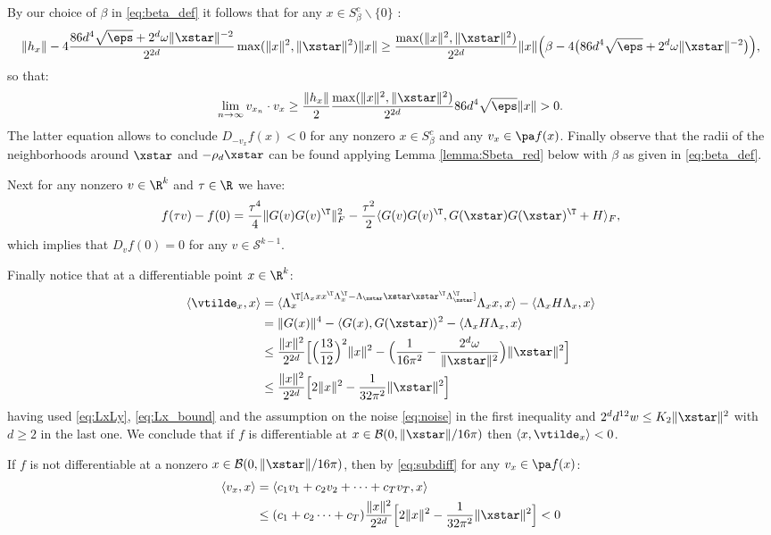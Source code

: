 By our choice of $\beta$ in \eqref{eq:beta_def} it follows that for 
any  $x \in S_\beta^{c} \backslash \{0\}$ :
\[
\|h_x\| - 4  \frac{86 d^4 \sqrt{\eps}  + 2^d \omega \|\xstar\|^{-2}}{2^{2d}}  \max(\|x\|^2, \|\xstar\|^2) \|x\|  \geq \frac{\max(\|x\|^2, \|\xstar\|^2)}{2^{2d}} \|x\| \Big(  \beta- 4 \big(86 d^4 \sqrt{\eps} + 2^d \omega \|\xstar\|^{-2} \big)  \Big),
\]
so that:
\[
\lim_{n \to \infty} v_{x_n} \cdot v_x \geq \frac{\| h_x \|}{2} \frac{\max(\|x\|^2, \|\xstar\|^2)}{2^{2d}} 86 d^4 \sqrt{\eps} \|x \|  > 0.
\]
The latter equation allows to conclude $D_{-v_x} f(x) < 0$  for any nonzero $x \in S_\beta^{c}$ and any $v_x \in \pa f(x)$.
Finally observe that the radii of the neighborhoods around $\xstar$ and $-\rho_d \xstar$ can be found  
applying Lemma \ref{lemma:Sbeta_red} below with $\beta$ as given in \eqref{eq:beta_def}.

Next for any nonzero $v \in \R^{k}$ and $\tau \in \R$ we have:
\[
f(\tau v ) - f(0) = \frac{\tau^4}{4} \|G(v)G(v)^\T\|^2_F - \frac{\tau^2}{2} \langle G(v)G(v)^\T, G(\xstar)G(\xstar)^\T + H \rangle_F,
\] 
which implies that $D_{v} f(0) = 0$ for any $v \in \mathcal{S}^{k-1}$.

Finally notice that at a differentiable point $x \in \R^k$:
\[
\begin{aligned}
\langle \vtilde_x, x \rangle &= \langle \Lambda_x^\T [\Lambda_x x x^\T \Lambda_x^\T - \Lambda_\xstar \xstar \xstar^\T \Lambda_\xstar^\T  ] \Lambda_x x, x \rangle  - \langle \Lambda_x H \Lambda_x , x\rangle \\
&= \|G(x)\|^4 - \langle G(x), G(\xstar)\rangle^2 - \langle \Lambda_x H \Lambda_x , x\rangle \\
&\leq \frac{\|x\|^2}{2^{2d}} \Big[ \Big(\frac{13}{12} \Big)^2 \|x\|^2 - 
\Big(\frac{1}{16 \pi^2} - \frac{2^d \omega}{\|\xstar\|^2} \Big) \|\xstar\|^2 \Big]  \\
&\leq \frac{\|x\|^2}{2^{2d}} \Big[ 2 \|x\|^2 - 
\frac{1}{32 \pi^2} \|\xstar\|^2 \Big]
\end{aligned}
\]
having used \eqref{eq:LxLy}, \eqref{eq:Lx_bound} and the assumption on the noise \eqref{eq:noise} in the first inequality and $2^d d^{12} w \leq K_2 \| \xstar \|^2$ with $d\geq 2$ in the last one. We conclude that if $f$ is differentiable at $x \in \mathcal{B}(0, \|\xstar\|/16 \pi)$ then $\langle x, \vtilde_x \rangle < 0$.

If $f$ is not differentiable at a nonzero  $x \in \mathcal{B}(0, \|\xstar\|/16 \pi)$, then  by \eqref{eq:subdiff} for any $v_x \in \pa f(x)$:
\[
\begin{aligned}
\langle v_x, x \rangle &=   \langle c_1 v_1 + c_2 v_2 + \dots + c_T v_T, x \rangle  \\
&\leq (c_1 + c_2 \dots +c_T) \frac{\|x\|^2}{2^{2d}} \Big[ 2 \|x\|^2 -  \frac{1}{32 \pi^2} \|\xstar\|^2 \Big] < 0
\end{aligned}
\]

